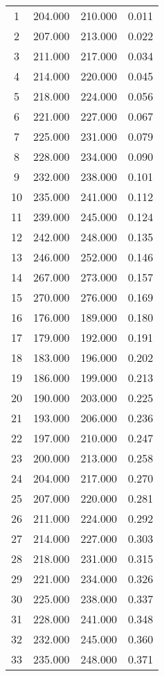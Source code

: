 % 
\begin{tabular}{cccc}
  \hline
  \hline
1 & 204.000 & 210.000 & 0.011 \\ 
  2 & 207.000 & 213.000 & 0.022 \\ 
  3 & 211.000 & 217.000 & 0.034 \\ 
  4 & 214.000 & 220.000 & 0.045 \\ 
  5 & 218.000 & 224.000 & 0.056 \\ 
  6 & 221.000 & 227.000 & 0.067 \\ 
  7 & 225.000 & 231.000 & 0.079 \\ 
  8 & 228.000 & 234.000 & 0.090 \\ 
  9 & 232.000 & 238.000 & 0.101 \\ 
  10 & 235.000 & 241.000 & 0.112 \\ 
  11 & 239.000 & 245.000 & 0.124 \\ 
  12 & 242.000 & 248.000 & 0.135 \\ 
  13 & 246.000 & 252.000 & 0.146 \\ 
  14 & 267.000 & 273.000 & 0.157 \\ 
  15 & 270.000 & 276.000 & 0.169 \\ 
  16 & 176.000 & 189.000 & 0.180 \\ 
  17 & 179.000 & 192.000 & 0.191 \\ 
  18 & 183.000 & 196.000 & 0.202 \\ 
  19 & 186.000 & 199.000 & 0.213 \\ 
  20 & 190.000 & 203.000 & 0.225 \\ 
  21 & 193.000 & 206.000 & 0.236 \\ 
  22 & 197.000 & 210.000 & 0.247 \\ 
  23 & 200.000 & 213.000 & 0.258 \\ 
  24 & 204.000 & 217.000 & 0.270 \\ 
  25 & 207.000 & 220.000 & 0.281 \\ 
  26 & 211.000 & 224.000 & 0.292 \\ 
  27 & 214.000 & 227.000 & 0.303 \\ 
  28 & 218.000 & 231.000 & 0.315 \\ 
  29 & 221.000 & 234.000 & 0.326 \\ 
  30 & 225.000 & 238.000 & 0.337 \\ 
  31 & 228.000 & 241.000 & 0.348 \\ 
  32 & 232.000 & 245.000 & 0.360 \\ 
  33 & 235.000 & 248.000 & 0.371 \\ 

\end{tabular}
